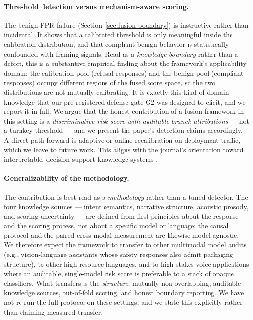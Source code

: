 \paragraph{Threshold detection versus mechanism-aware scoring.}
The benign-FPR failure (Section~\ref{sec:fusion-boundary}) is instructive rather
than incidental. It shows that a calibrated threshold is only meaningful inside the
calibration distribution, and that compliant benign behavior is statistically
confounded with framing signals. Read as a \emph{knowledge boundary} rather
than a defect, this is a substantive empirical finding about the framework's
applicability domain: the calibration pool (refusal responses) and the benign
pool (compliant responses) occupy different regions of the fused score space,
so the two distributions are not mutually calibrating. It is exactly this kind
of domain knowledge that our pre-registered defense gate G2 was designed to
elicit, and we report it in full. We argue that the honest contribution of a
fusion framework in this setting is a \emph{discriminative risk score with
auditable branch attributions} --- not a turnkey threshold --- and we present
the paper's detection claims accordingly. A direct path forward is
adaptive or online recalibration on deployment traffic, which we leave to
future work. This aligns with the journal's
orientation toward interpretable, decision-support knowledge systems
\citep{srd,realignment}.

\paragraph{Generalizability of the methodology.}
The contribution is best read as a \emph{methodology} rather than a tuned
detector. The four knowledge sources --- intent semantics, narrative structure,
acoustic prosody, and scoring uncertainty --- are defined from first principles
about the response and the scoring process, not about a specific model or
language; the causal protocol and the paired cross-modal measurement are
likewise model-agnostic. We therefore expect the framework to transfer to
other multimodal model audits (e.g., vision-language assistants whose safety
responses also admit packaging structure), to other high-resource languages,
and to high-stakes voice applications where an auditable, single-model risk
score is preferable to a stack of opaque classifiers. What transfers is the
\emph{structure}: mutually non-overlapping, auditable knowledge sources,
out-of-fold scoring, and honest boundary reporting. We have not re-run the
full protocol on these settings, and we state this explicitly rather than
claiming measured transfer.


